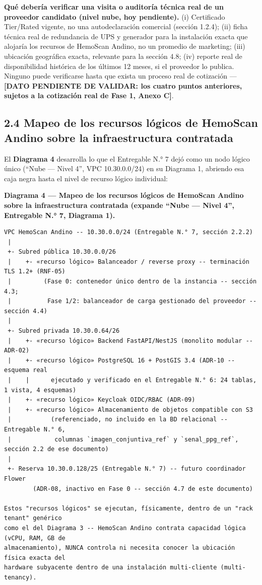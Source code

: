 \documentclass[11pt,a4paper]{article}
\begin{document}
\textbf{Qué debería verificar una visita o auditoría técnica real de un proveedor candidato (nivel nube, hoy pendiente).} (i) Certificado Tier/Rated vigente, no una autodeclaración comercial (sección 1.2.4); (ii) ficha técnica real de redundancia de UPS y generador para la instalación exacta que alojaría los recursos de HemoScan Andino, no un promedio de marketing; (iii) ubicación geográfica exacta, relevante para la sección 4.8; (iv) reporte real de disponibilidad histórica de los últimos 12 meses, si el proveedor lo publica. Ninguno puede verificarse hasta que exista un proceso real de cotización --- \textbf{{[}DATO PENDIENTE DE VALIDAR: los cuatro puntos anteriores, sujetos a la cotización real de Fase 1, Anexo C{]}}.

\subsection{2.4 Mapeo de los recursos lógicos de HemoScan Andino sobre la infraestructura contratada}\label{mapeo-de-los-recursos-luxf3gicos-de-hemoscan-andino-sobre-la-infraestructura-contratada}

El \textbf{Diagrama 4} desarrolla lo que el Entregable N.° 7 dejó como un nodo lógico único (``Nube --- Nivel 4'', VPC 10.30.0.0/24) en su Diagrama 1, abriendo esa caja negra hasta el nivel de recurso lógico individual:

\textbf{Diagrama 4 --- Mapeo de los recursos lógicos de HemoScan Andino sobre la infraestructura contratada (expande ``Nube --- Nivel 4'', Entregable N.° 7, Diagrama 1).}

\begin{samepage}\begin{verbatim}
VPC HemoScan Andino -- 10.30.0.0/24 (Entregable N.° 7, sección 2.2.2)
 |
 +- Subred pública 10.30.0.0/26
 |    +- «recurso lógico» Balanceador / reverse proxy -- terminación TLS 1.2+ (RNF-05)
 |         (Fase 0: contenedor único dentro de la instancia -- sección 4.3;
 |          Fase 1/2: balanceador de carga gestionado del proveedor -- sección 4.4)
 |
 +- Subred privada 10.30.0.64/26
 |    +- «recurso lógico» Backend FastAPI/NestJS (monolito modular -- ADR-02)
 |    +- «recurso lógico» PostgreSQL 16 + PostGIS 3.4 (ADR-10 -- esquema real
 |    |      ejecutado y verificado en el Entregable N.° 6: 24 tablas, 1 vista, 4 esquemas)
 |    +- «recurso lógico» Keycloak OIDC/RBAC (ADR-09)
 |    +- «recurso lógico» Almacenamiento de objetos compatible con S3
 |           (referenciado, no incluido en la BD relacional -- Entregable N.° 6,
 |            columnas `imagen_conjuntiva_ref` y `senal_ppg_ref`, sección 2.2 de ese documento)
 |
 +- Reserva 10.30.0.128/25 (Entregable N.° 7) -- futuro coordinador Flower
        (ADR-08, inactivo en Fase 0 -- sección 4.7 de este documento)

Estos "recursos lógicos" se ejecutan, físicamente, dentro de un "rack tenant" genérico
como el del Diagrama 3 -- HemoScan Andino contrata capacidad lógica (vCPU, RAM, GB de
almacenamiento), NUNCA controla ni necesita conocer la ubicación física exacta del
hardware subyacente dentro de una instalación multi-cliente (multi-tenancy).
\end{verbatim}\end{samepage}
\end{document}

